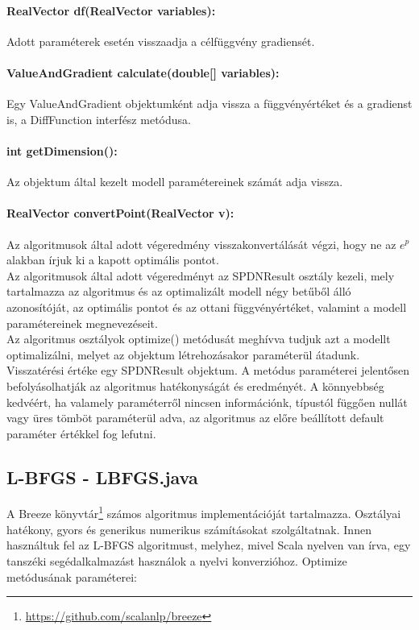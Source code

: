 \paragraph{RealVector df(RealVector variables):} Adott paraméterek esetén visszaadja a célfüggvény gradiensét.
\paragraph{ValueAndGradient calculate(double[] variables):} Egy ValueAndGradient objektumként adja vissza a függvényértéket és a gradienst is, a DiffFunction interfész metódusa.
\paragraph{int getDimension():} Az objektum által kezelt modell paramétereinek számát adja vissza.
\paragraph{RealVector convertPoint(RealVector v):} Az algoritmusok által adott végeredmény visszakonvertálását végzi, hogy ne az $e^p$ alakban írjuk ki a kapott optimális pontot.\\

Az algoritmusok által adott végeredményt az SPDNResult osztály kezeli, mely tartalmazza az algoritmus és az optimalizált modell négy betűből álló azonosítóját, az optimális pontot és az ottani függvényértéket, valamint a modell paramétereinek megnevezéseit. \\

Az algoritmus osztályok optimize() metódusát meghívva tudjuk azt a modellt optimalizálni, melyet az objektum létrehozásakor paraméterül átadunk. Visszatérési értéke egy SPDNResult objektum. A metódus paraméterei jelentősen befolyásolhatják az algoritmus hatékonyságát és eredményét. A könnyebbség kedvéért, ha valamely paraméterről nincsen információnk, típustól függően nullát vagy üres tömböt paraméterül adva, az algoritmus az előre beállított default paraméter értékkel fog lefutni.

\subsection{L-BFGS - LBFGS.java}
A Breeze könyvtár\footnote{\url{https://github.com/scalanlp/breeze}} számos algoritmus implementációját tartalmazza. Osztályai hatékony, gyors és generikus numerikus számításokat szolgáltatnak. Innen használtuk fel az L-BFGS algoritmust, melyhez, mivel Scala nyelven van írva, egy tanszéki segédalkalmazást használok a nyelvi konverzióhoz. Optimize metódusának paraméterei:
